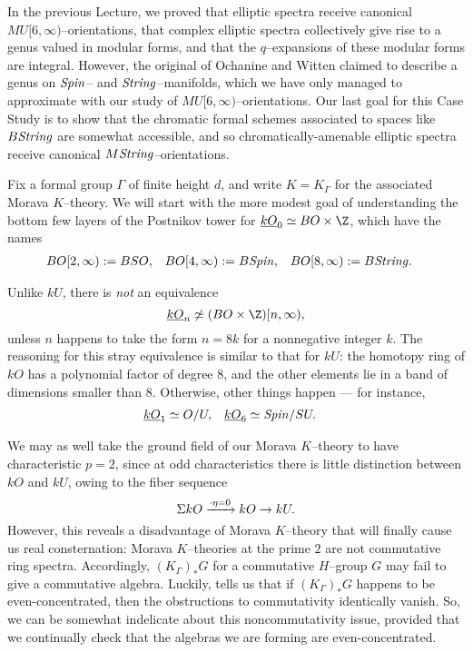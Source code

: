 In the previous Lecture, we proved that elliptic spectra receive canonical $MU[6, \infty)$--orientations, that complex elliptic spectra collectively give rise to a genus valued in modular forms, and that the $q$--expansions of these modular forms are integral.  However, the original  of Ochanine and Witten claimed to describe a genus on $\mathit{Spin}$-- and $\mathit{String}$--manifolds, which we have only managed to approximate with our study of $MU[6, \infty)$--orientations.  Our last goal for this Case Study is to show that the chromatic formal schemes associated to spaces like $B\mathit{String}$ are somewhat accessible, and so chromatically-amenable elliptic spectra receive canonical $M\mathit{String}$--orientations.

Fix a formal group $\Gamma$ of finite height $d$, and write $K = K_\Gamma$ for the associated Morava $K$--theory.  We will start with the more modest goal of understanding the bottom few layers of the Postnikov tower for $\OS{kO}{0} \simeq BO \times \Z$, which have the names
\begin{align*}
BO[2, \infty) & := BSO, &
BO[4, \infty) & := B\mathit{Spin}, &
BO[8, \infty) & := B\mathit{String}.
\end{align*}

\begin{remark}
Unlike $kU$, there is \emph{not} an equivalence \[\OS{kO}{n} \not\simeq (BO \times \Z)[n, \infty),\] unless $n$ happens to take the form $n = 8k$ for a nonnegative integer $k$.  The reasoning for this stray equivalence is similar to that for $kU$: the homotopy ring of $kO$ has a polynomial factor of degree $8$, and the other elements lie in a band of dimensions smaller than $8$.  Otherwise, other things happen --- for instance,
\begin{align*}
\underline{\smash{kO}}_{1} & \simeq O/U, &
\underline{\smash{kO}}_{6} & \simeq \mathit{Spin} / SU.
\end{align*}
\end{remark}

\begin{remark}
We may as well take the ground field of our Morava $K$--theory to have characteristic $p = 2$, since at odd characteristics there is little distinction between $kO$ and $kU$, owing to the fiber sequence \[\Sigma kO \xrightarrow{\cdot \eta = 0} kO \to kU.\]  However, this reveals a disadvantage of Morava $K$--theory that will finally cause us real consternation: Morava $K$--theories at the prime $2$ are not commutative ring spectra.  Accordingly, $(K_\Gamma)_* G$ for a commutative $H$--group $G$ may fail to give a commutative algebra.  Luckily,  tells us that if $(K_\Gamma)_* G$ happens to be even-concentrated, then the obstructions to commutativity identically vanish.  So, we can be somewhat indelicate about this noncommutativity issue, provided that we continually check that the algebras we are forming are even-concentrated.
\end{remark}

